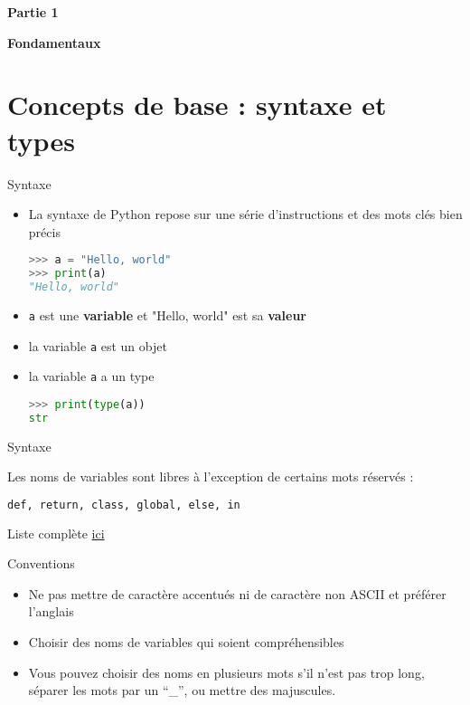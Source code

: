 
\begin{frame}{}
  \centering
  \Large
  \textbf{Partie 1}

  \textbf{Fondamentaux}
\end{frame}

\section{Concepts de base : syntaxe et types}

\begin{frame}[fragile]{Syntaxe}
  
  \begin{itemize}
    \item<+->[\textcolor{white}{a}] La syntaxe de Python repose sur une série d'instructions et des mots clés bien précis
\begin{lstlisting}[language=Python, morekeywords={as, TypeError}, numbers=none]
>>> a = "Hello, world"
>>> print(a)
"Hello, world"
\end{lstlisting}
    \item<+-> \texttt{a} est une \textbf{variable} et "Hello, world" est sa \textbf{valeur}
    \item<+-> la variable \texttt{a} est un objet
    \item<+-> la variable \texttt{a} a un type
\begin{lstlisting}[language=Python, morekeywords={as, TypeError}, numbers=none]
>>> print(type(a))
str
\end{lstlisting}
  \end{itemize}
\end{frame}

\begin{frame}[fragile]{Syntaxe}

  Les noms de variables sont libres à l'exception de certains mots réservés :

\begin{lstlisting}[language=bash, morekeywords={def, list, class, global, else, in}, numbers=none]
def, return, class, global, else, in
\end{lstlisting}

Liste complète \href{https://docs.python.org/3/reference/lexical\_analysis.html\#keywords}{ici}

\begin{block}{Conventions}
  \begin{itemize}
    \item Ne pas mettre de caractère accentués ni de caractère non ASCII et préférer l'anglais
    \item Choisir des noms de variables qui soient compréhensibles
    \item Vous pouvez choisir des noms en plusieurs mots s'il n'est pas trop long, séparer les mots par un ``\_'', ou mettre des majuscules.
  \end{itemize}
\end{block}
\end{frame}

